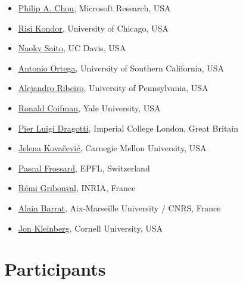 \documentclass[a4paper]{scrartcl}
\begin{document}
\begin{itemize}
\begin{itemize}
		{Sergio Barbarossa}, Sapienza University of Rome, Italy
	\item \href{http://research.microsoft.com/en-us/people/pachou/}
		{Philip A. Chou}, Microsoft Research, USA
	\item \href{http://people.cs.uchicago.edu/~risi/}
		{Risi Kondor}, University of Chicago, USA
	\item \href{http://www.math.ucdavis.edu/~saito/}
		{Naoky Saito}, UC Davis, USA
	\item \href{http://ee.usc.edu/faculty_staff/faculty_directory/ortega.htm}
		{Antonio Ortega}, University of Southern California, USA
	\item \href{http://alliance.seas.upenn.edu/~aribeiro/wiki/}
		{Alejandro Ribeiro}, University of Pennsylvania, USA
	\item \href{http://cpsc.yale.edu/people/ronald-coifman}
		{Ronald Coifman}, Yale University, USA
	\item \href{http://www.commsp.ee.ic.ac.uk/~pld/}
		{Pier Luigi Dragotti}, Imperial College London, Great Britain
	\item \href{http://jelena.ece.cmu.edu/}
		{Jelena Kovačević}, Carnegie Mellon University, USA
	\item \href{http://people.epfl.ch/pascal.frossard}
		{Pascal Frossard}, EPFL, Switzerland
	\item \href{http://people.irisa.fr/Remi.Gribonval/}
		{Rémi Gribonval}, INRIA, France
	\item \href{http://www.cpt.univ-mrs.fr/~barrat/english.html}
		{Alain Barrat}, Aix-Marseille University / CNRS, France
	\item \href{http://www.cs.cornell.edu/home/kleinber/}
		{Jon Kleinberg}, Cornell University, USA
	\end{itemize}
\end{itemize}

\section{Participants}
\end{document}
